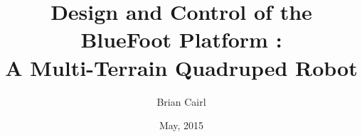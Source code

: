 





\renewcommand{\baselinestretch}{1.6}
\newtheorem{theorem}{Theorem}[chapter]
\newcommand{\btheorem}{\begin{theorem}\rm}
\newcommand{\etheorem}{$\diamond$\end{theorem}}
\newtheorem{definition}{Definition}[chapter]
\newcommand{\bdefn}{\begin{definition}\rm}
\newcommand{\edefn}{\end{definition}}
\newtheorem{lemma}{Lemma}[chapter]
\newtheorem{remark}{Remark}[chapter]
\newcommand{\bremark}{\begin{remark}\rm}
\newcommand{\eremark}{\end{remark}}
\newtheorem{example}{Example}[chapter]
\newcommand{\bexample}{\begin{example}\rm}
\newcommand{\eexample}{\end{example}}
\newtheorem{assumption}{Assumption}[chapter]
\newcommand{\bassump}{\begin{assumption}\rm}
\newcommand{\eassump}{\end{assumption}}

\title{Design and Control of the BlueFoot Platform :\\A Multi-Terrain Quadruped Robot }
\author{Brian Cairl}
\date{May, 2015}
\mstitlepage
\topmargin=0.4in
\textwidth=6.0in
\textheight=9.0in

\setcounter{page}{1}








\normalsize
\tableofcontents
\listoffigures
\listoftables
\newpage
\setcounter{page}{1}
	
	
	
	
	
	
	
	\begin{appendices}
		
		
		
	\end{appendices}




